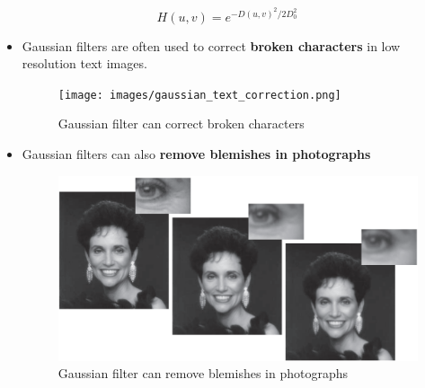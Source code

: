\begin{itemize}
\begin{itemize}
        \begin{equation*}
          H(u, v) = e^{-D(u, v)^2/2D_0^2}
        \end{equation*}

        \begin{itemize}
          \item Gaussian filters are often used to correct \textbf{broken
            characters} in low resolution text images.

            \begin{minipage}{\linewidth}
              \vspace{-0.5cm}
              \begin{figure}[H]
                \centering
                \texttt{[image: images/gaussian\_text\_correction.png]}
                \caption{Gaussian filter can correct broken characters}
              \end{figure}
            \end{minipage}

          \item Gaussian filters can also \textbf{remove blemishes in photographs}

            \begin{minipage}{\linewidth}
              \vspace{-0.4cm}
              \begin{figure}[H]
                \centering
                \includegraphics[width=\linewidth]{images/gaussian_photo_correction.png}
                \caption{Gaussian filter can remove blemishes in photographs}
              \end{figure}
            \end{minipage}
        \end{itemize}
    \end{itemize}
    

\end{itemize}
